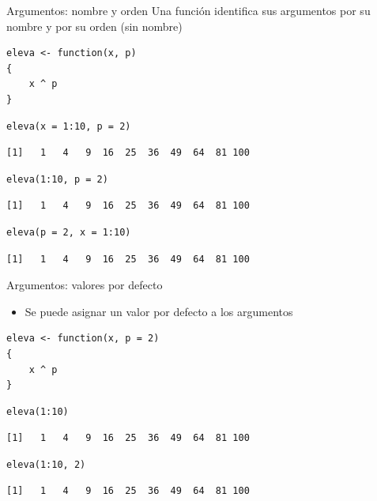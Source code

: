 \documentclass[aspectratio=169, usenames,svgnames,dvipsnames]{beamer}
\begin{document}
\begin{frame}[label={sec:org6300297},fragile]{Argumentos: nombre y orden}
 Una función identifica sus argumentos por su nombre y por su orden (sin nombre)

\lstset{language=r,label= ,caption= ,captionpos=b,numbers=none}
\begin{lstlisting}
eleva <- function(x, p)
{
    x ^ p
}
\end{lstlisting}

\lstset{language=r,label= ,caption= ,captionpos=b,numbers=none}
\begin{lstlisting}
eleva(x = 1:10, p = 2)
\end{lstlisting}

\begin{verbatim}
[1]   1   4   9  16  25  36  49  64  81 100
\end{verbatim}


\lstset{language=r,label= ,caption= ,captionpos=b,numbers=none}
\begin{lstlisting}
eleva(1:10, p = 2)
\end{lstlisting}

\begin{verbatim}
[1]   1   4   9  16  25  36  49  64  81 100
\end{verbatim}


\lstset{language=r,label= ,caption= ,captionpos=b,numbers=none}
\begin{lstlisting}
eleva(p = 2, x = 1:10)
\end{lstlisting}

\begin{verbatim}
[1]   1   4   9  16  25  36  49  64  81 100
\end{verbatim}
\end{frame}

\begin{frame}[label={sec:org0996daa},fragile]{Argumentos: valores por defecto}
 \begin{itemize}
\item Se puede asignar un valor por defecto a los argumentos
\end{itemize}
\lstset{language=r,label= ,caption= ,captionpos=b,numbers=none}
\begin{lstlisting}
eleva <- function(x, p = 2)
{
    x ^ p
}
\end{lstlisting}

\lstset{language=r,label= ,caption= ,captionpos=b,numbers=none}
\begin{lstlisting}
eleva(1:10)
\end{lstlisting}

\begin{verbatim}
[1]   1   4   9  16  25  36  49  64  81 100
\end{verbatim}


\lstset{language=r,label= ,caption= ,captionpos=b,numbers=none}
\begin{lstlisting}
eleva(1:10, 2)
\end{lstlisting}

\begin{verbatim}
[1]   1   4   9  16  25  36  49  64  81 100
\end{verbatim}
\end{frame}
\end{document}
